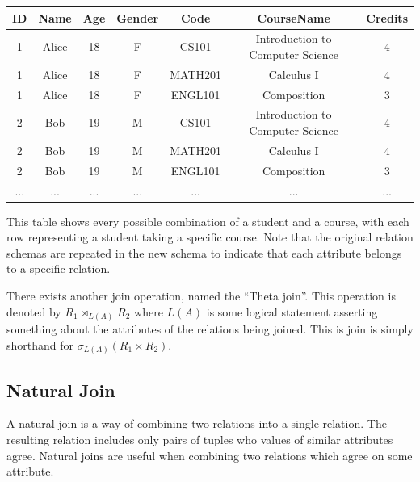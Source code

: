 \documentclass{report}
\begin{document}
{\begin{center}
    \begin{tabular}{|c|c|c|c|c|c|c|}
        \hline
        ID & Name & Age & Gender & Code & CourseName & Credits \\
        \hline
        1 & Alice & 18 & F & CS101 & Introduction to Computer Science & 4 \\
        \hline
        1 & Alice & 18 & F & MATH201 & Calculus I & 4 \\
        \hline
        1 & Alice & 18 & F & ENGL101 & Composition & 3 \\
        \hline
        2 & Bob & 19 & M & CS101 & Introduction to Computer Science & 4 \\
        \hline
        2 & Bob & 19 & M & MATH201 & Calculus I & 4 \\
        \hline
        2 & Bob & 19 & M & ENGL101 & Composition & 3 \\
        \hline
        ... & ... & ... & ... & ... & ... & ... \\
        \hline
    \end{tabular}
\end{center}


This table shows every possible combination of a student and a course, with each row representing a student taking a specific course. Note that the original relation schemas are repeated in the new schema to indicate that each attribute belongs to a specific relation.}

        \begin{note}
            There exists another join operation, named the ``Theta join''. This operation is denoted by $R_1 \bowtie_{L(A)} R_2$ where $L(A)$ is some logical statement asserting something about the attributes of the relations being joined. This is join is simply shorthand for $\sigma_{L(A)}(R_1 \times R_2)$.
        \end{note}


        \subsection{Natural Join}

        A natural join is a way of combining two relations into a single relation. The resulting relation includes only pairs of tuples who values of similar attributes agree. Natural joins are useful when combining two relations which agree on some attribute. 
\end{document}
